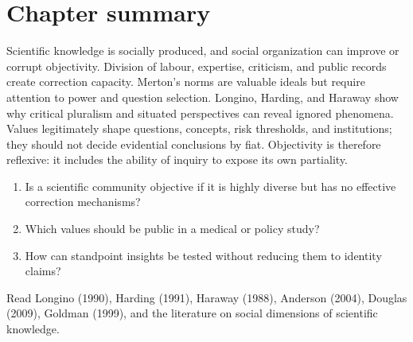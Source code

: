 \section*{Chapter summary}

Scientific knowledge is socially produced, and social organization can improve
or corrupt objectivity. Division of labour, expertise, criticism, and public
records create correction capacity. Merton's norms are valuable ideals but
require attention to power and question selection. Longino, Harding, and
Haraway show why critical pluralism and situated perspectives can reveal
ignored phenomena. Values legitimately shape questions, concepts, risk
thresholds, and institutions; they should not decide evidential conclusions by
fiat. Objectivity is therefore reflexive: it includes the ability of inquiry to
expose its own partiality.

\begin{discussion}
\begin{enumerate}
\item Is a scientific community objective if it is highly diverse but has no
effective correction mechanisms?
\item Which values should be public in a medical or policy study?
\item How can standpoint insights be tested without reducing them to identity
claims?
\end{enumerate}
\end{discussion}

\begin{furtherreading}
Read Longino (1990), Harding (1991), Haraway (1988), Anderson (2004),
Douglas (2009), Goldman (1999), and the literature on social dimensions of
scientific knowledge.
\end{furtherreading}

